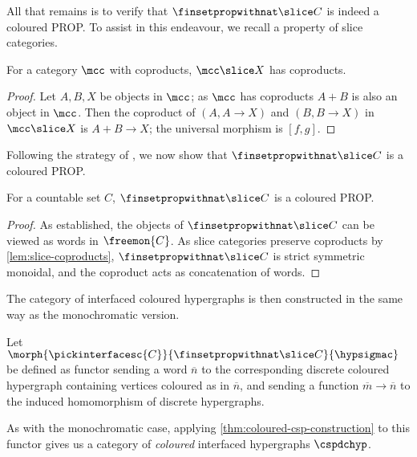 All that remains is to verify that \(\finsetpropwithnat \slice C\) is indeed a
coloured PROP.
To assist in this endeavour, we recall a property of slice categories.

\begin{lemma}\label{lem:slice-coproducts}
    For a category \(\mcc\) with coproducts, \(\mcc \slice X\) has coproducts.
\end{lemma}
\begin{proof}
    Let \(A,B,X\) be objects in \(\mcc\); as \(\mcc\) has coproducts \(A + B\)
    is also an object in \(\mcc\).
    Then the coproduct of \((A, A \to X)\) and \((B, B \to X)\) in
    \(\mcc \slice X\) is \(A + B \to X\); the universal morphism is \([f, g]\).
\end{proof}

Following the strategy of \cite[Prop.\ 2.23]{bonchi2022string}, we now show
that \(\finsetpropwithnat \slice C\) is a coloured PROP.

\begin{proposition}\label{prop:hatfinsetprop-slice-is-coloured-prop}
    For a countable set \(C\), \(\finsetpropwithnat \slice C\) is a
    coloured PROP.
\end{proposition}
\begin{proof}
    As established, the objects of \(\finsetpropwithnat \slice C\) can be viewed
    as words in \(\freemon{C}\).
    As slice categories preserve coproducts by \cref{lem:slice-coproducts},
    \(\finsetpropwithnat \slice C\) is strict symmetric monoidal, and the
    coproduct acts as concatenation of words.
\end{proof}

The category of interfaced coloured hypergraphs is then constructed in the same
way as the monochromatic version.

\begin{definition}
    Let \(\morph{\pickinterfacesc{C}}{\finsetpropwithnat \slice C}{\hypsigmac}\)
    be defined as functor sending a word \(\overline{n}\) to the corresponding
    discrete coloured hypergraph containing vertices coloured as in
    \(\overline{n}\), and sending a function \(\overline{m} \to \overline{n}\)
    to the induced homomorphism of discrete hypergraphs.
\end{definition}

As with the monochromatic case, applying \cref{thm:coloured-csp-construction} to
this functor gives us a category of \emph{coloured} interfaced hypergraphs
\(\cspdchyp\).

